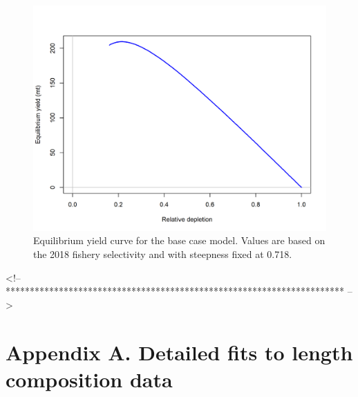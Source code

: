 \documentclass[12pt,]{article}
\begin{document}
\begin{figure}
\centering
\includegraphics{r4ss/plots_mod1/yield1_yield_curve.png}
\caption{Equilibrium yield curve for the base case model. Values are
based on the 2018 fishery selectivity and with steepness fixed at 0.718.
\label{fig:yield1_yield_curve}}
\end{figure}

\FloatBarrier
<!-- ********************************************************************** -->

\FloatBarrier
\newpage

\section*{Appendix A. Detailed fits to length composition
data}\label{appendix-a.-detailed-fits-to-length-composition-data}

\renewcommand{\thepage}{A-\arabic{page}}
\renewcommand{\thefigure}{A\arabic{figure}}

\setcounter{page}{1}
\end{document}
